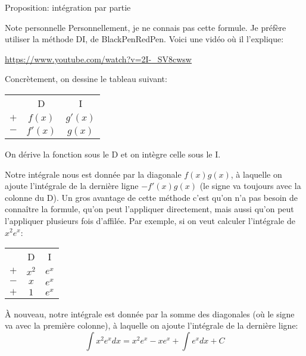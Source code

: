 \documentclass[a4paper]{article}
\begin{document}
\begin{parag}{Proposition: intégration par partie}
    \begin{subparag}{Note personnelle}
        Personnellement, je ne connais pas cette formule. Je préfère utiliser la méthode DI, de BlackPenRedPen. Voici une vidéo où il l'explique:
        \begin{center}
            \url{https://www.youtube.com/watch?v=2I-_SV8cwsw}
        \end{center}

        Concrètement, on dessine le tableau suivant:
        \begin{center}
        \begin{tabular}{ccc}
            & D & I  \\
            $+$ & $\displaystyle f\left(x\right)$ & $\displaystyle g'\left(x\right)$  \\
            $-$ & $f'\left(x\right)$ & $g\left(x\right)$
        \end{tabular}
        \end{center}

        On dérive la fonction sous le D et on intègre celle sous le I.

        Notre intégrale nous est donnée par la diagonale $f\left(x\right)g\left(x\right)$, à laquelle on ajoute l'intégrale de la dernière ligne $-f'\left(x\right)g\left(x\right)$ (le signe va toujours avec la colonne du D). Un gros avantage de cette méthode c'est qu'on n'a pas besoin de connaître la formule, qu'on peut l'appliquer directement, mais aussi qu'on peut l'appliquer plusieurs fois d'affilée. Par exemple, si on veut calculer l'intégrale de $x^2 e^x$:
        \begin{center}
        \begin{tabular}{ccc}
            & D & I  \\
            $+$ & $\displaystyle x^2$ & $\displaystyle e^x$  \\
            $-$ & $\displaystyle x$ & $\displaystyle e^x$  \\
            $+$ & $\displaystyle 1$ & $\displaystyle e^x$
        \end{tabular}
        \end{center}

        À nouveau, notre intégrale est donnée par la somme des diagonales (où le signe va avec la première colonne), à laquelle on ajoute l'intégrale de la dernière ligne:
        \[\int x^2 e^x dx = x^2 e^x - xe^x + \int e^x dx + C\]


\end{subparag}
\end{parag}
\end{document}
